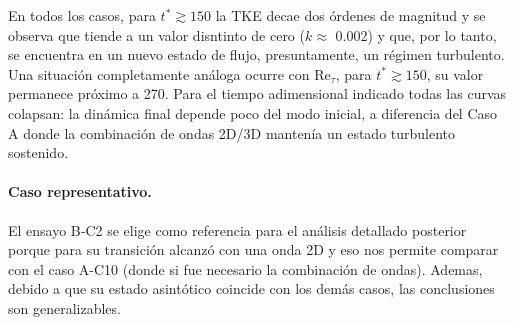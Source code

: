 En todos los casos, para $t^* \gtrsim 150$ la TKE decae dos órdenes de magnitud y se observa que tiende a un valor disntinto de cero ($k \approx$ 0.002) y que, por lo tanto, se encuentra en un nuevo estado de flujo, presuntamente, un régimen turbulento. Una situación completamente análoga ocurre con Re$_{\tau}$, para $t^* \gtrsim 150$, su valor permanece próximo a 270. Para el tiempo adimensional indicado todas las curvas colapsan: la dinámica final depende poco del modo inicial, a diferencia del Caso A donde la combinación de ondas 2D/3D mantenía un estado turbulento sostenido.

\paragraph{Caso representativo.} El ensayo B‑C2 se elige como referencia para el análisis detallado posterior porque para su transición alcanzó con una onda 2D y eso nos permite comparar con el caso A-C10 (donde si fue necesario la combinación de ondas). Ademas, debido a que su estado asintótico coincide con los demás casos, las conclusiones son generalizables.


\begin{table}[H]
\centering
\caption{Parámetros de las condiciones iniciales para el caso B (Re$_o$ = 5000, Pr = 0.71, Ri$_b$ = 1.06).}
\label{tab:grupo2}
\end{table}

